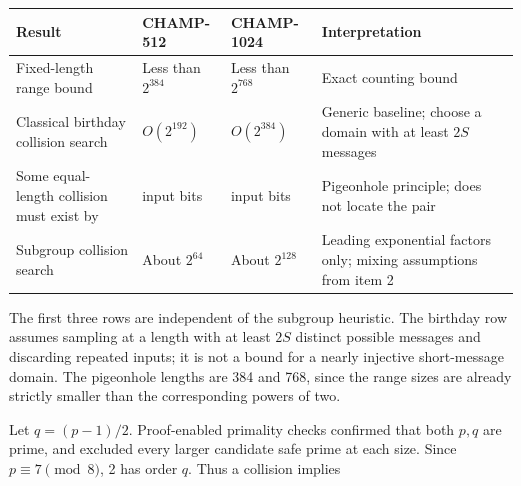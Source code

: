 \documentclass[
  english,
  11pt,
  a4paper,
]{article}
\newcounter{none} %
\begin{document}
{\def\LTcaptype{none} %
\begin{longtable}[]{@{}
  >{\raggedright\arraybackslash}p{}
  >{\centering\arraybackslash}p{}
  >{\centering\arraybackslash}p{}
  >{\raggedright\arraybackslash}p{}@{}}
\toprule\noalign{}
\begin{minipage}[b]{\linewidth}\raggedright
Result
\end{minipage} & \begin{minipage}[b]{\linewidth}\centering
CHAMP-512
\end{minipage} & \begin{minipage}[b]{\linewidth}\centering
CHAMP-1024
\end{minipage} & \begin{minipage}[b]{\linewidth}\raggedright
Interpretation
\end{minipage} \\
\midrule\noalign{}
\endhead
\bottomrule\noalign{}
\endlastfoot
Fixed-length range bound & Less than \(2^{384}\) & Less than \(2^{768}\)
& Exact counting bound \\
Classical birthday collision search & \(O(2^{192})\) & \(O(2^{384})\) &
Generic baseline; choose a domain with at least \(2S\) messages \\
Some equal-length collision must exist by & 384 input bits & 768 input
bits & Pigeonhole principle; does not locate the pair \\
Subgroup collision search & About \(2^{64}\) & About \(2^{128}\) &
Leading exponential factors only; mixing assumptions from item 2 \\
\end{longtable}
}

The first three rows are independent of the subgroup heuristic. The
birthday row assumes sampling at a length with at least \(2S\) distinct
possible messages and discarding repeated inputs; it is not a bound for
a nearly injective short-message domain. The pigeonhole lengths are 384
and 768, since the range sizes are already strictly smaller than the
corresponding powers of two.


Let \(q=(p-1)/2\). Proof-enabled primality checks confirmed that both
\(p,q\) are prime, and excluded every larger candidate safe prime at
each size. Since \(p\equiv7\pmod8\), 2 has order \(q\). Thus a collision
implies
\end{document}
